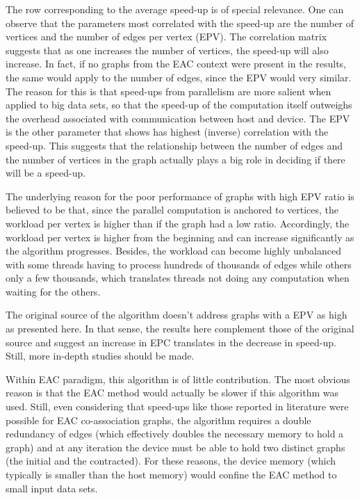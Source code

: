 

The row corresponding to the average speed-up is of special relevance.
One can observe that the parameters most correlated with the speed-up are the number of vertices and the number of edges per vertex (EPV).
The correlation matrix suggests that as one increases the number of vertices, the speed-up will also increase.
In fact, if no graphs from the EAC context were present in the results, the same would apply to the number of edges, since the EPV would very similar.
The reason for this is that speed-ups from parallelism are more salient when applied to big data sets, so that the speed-up of the computation itself outweighs the overhead associated with communication between host and device.
The EPV is the other parameter that shows has highest (inverse) correlation with the speed-up.
This suggests that the relationship between the number of edges and the number of vertices in the graph actually plays a big role in deciding if there will be a speed-up.

The underlying reason for the poor performance of graphs with high EPV ratio is believed to be that, since the parallel computation is anchored to vertices, the workload per vertex is higher than if the graph had a low ratio.
Accordingly, the workload per vertex is higher from the beginning and can increase significantly as the algorithm progresses.
Besides, the workload can become highly unbalanced with some threads having to process hundreds of thousands of edges while others only a few thousands, which translates threads not doing any computation when waiting for the others.

The original source \cite{Sousa2015} of the algorithm doesn't address graphs with a EPV as high as presented here.
In that sense, the results here complement those of the original source and suggest an increase in EPC translates in the decrease in speed-up.
Still, more in-depth studies should be made.

Within EAC paradigm, this algorithm is of little contribution.
The most obvious reason is that the EAC method would actually be slower if this algorithm was used.
Still, even considering that speed-ups like those reported in literature were possible for EAC co-association graphs, the algorithm requires a double redundancy of edges (which effectively doubles the necessary memory to hold a graph) and at any iteration the device must be able to hold two distinct graphs (the initial and the contracted).
For these reasons, the device memory (which typically is smaller than the host memory) would confine the EAC method to small input data sets. 

